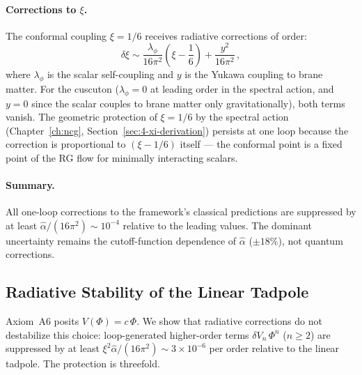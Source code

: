 \paragraph{Corrections to $\xi$.}
The conformal coupling $\xi = 1/6$ receives radiative corrections of order:
\begin{equation}
  \delta\xi \sim \frac{\lambda_\phi}{16\pi^2}\left(\xi - \frac{1}{6}\right) + \frac{y^2}{16\pi^2}\,,
\end{equation}
where $\lambda_\phi$ is the scalar self-coupling and $y$ is the Yukawa coupling to brane matter. For the cuscuton ($\lambda_\phi = 0$ at leading order in the spectral action, and $y = 0$ since the scalar couples to brane matter only gravitationally), both terms vanish. The geometric protection of $\xi = 1/6$ by the spectral action (Chapter~\ref{ch:ncg}, Section~\ref{sec:4-xi-derivation}) persists at one loop because the correction is proportional to $(\xi - 1/6)$ itself --- the conformal point is a fixed point of the RG flow for minimally interacting scalars.

\paragraph{Summary.}
All one-loop corrections to the framework's classical predictions are suppressed by at least $\hat{\alpha}/(16\pi^2) \sim 10^{-4}$ relative to the leading values. The dominant uncertainty remains the cutoff-function dependence of $\hat{\alpha}$ ($\pm 18\%$), not quantum corrections.


\subsection{Radiative Stability of the Linear Tadpole}
\label{app:tadpole-stability}

Axiom~A6 posits $V(\Phi) = c\,\Phi$. We show that radiative corrections do not destabilize this choice: loop-generated higher-order terms $\delta V_n\,\Phi^n$ ($n \geq 2$) are suppressed by at least $\xi^2\hat{\alpha}/(16\pi^2) \sim 3 \times 10^{-6}$ per order relative to the linear tadpole. The protection is threefold.

